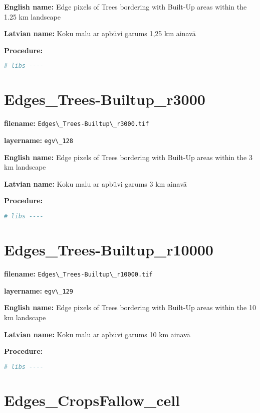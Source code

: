 \documentclass[
]{book}
\newcommand{\passthrough}[1]{#1}
\begin{document}
\textbf{English name:} Edge pixels of Trees bordering with Built-Up areas within the 1.25 km landscape

\textbf{Latvian name:} Koku malu ar apbūvi garums 1,25 km ainavā

\textbf{Procedure:}

\begin{lstlisting}[language=R]
# libs ----
\end{lstlisting}

\section{Edges\_Trees-Builtup\_r3000}\label{ch06.128}

\textbf{filename:} \passthrough{\lstinline!Edges\_Trees-Builtup\_r3000.tif!}

\textbf{layername:} \passthrough{\lstinline!egv\_128!}

\textbf{English name:} Edge pixels of Trees bordering with Built-Up areas within the 3 km landscape

\textbf{Latvian name:} Koku malu ar apbūvi garums 3 km ainavā

\textbf{Procedure:}

\begin{lstlisting}[language=R]
# libs ----
\end{lstlisting}

\section{Edges\_Trees-Builtup\_r10000}\label{ch06.129}

\textbf{filename:} \passthrough{\lstinline!Edges\_Trees-Builtup\_r10000.tif!}

\textbf{layername:} \passthrough{\lstinline!egv\_129!}

\textbf{English name:} Edge pixels of Trees bordering with Built-Up areas within the 10 km landscape

\textbf{Latvian name:} Koku malu ar apbūvi garums 10 km ainavā

\textbf{Procedure:}

\begin{lstlisting}[language=R]
# libs ----
\end{lstlisting}

\section{Edges\_CropsFallow\_cell}\label{ch06.130}
\end{document}

